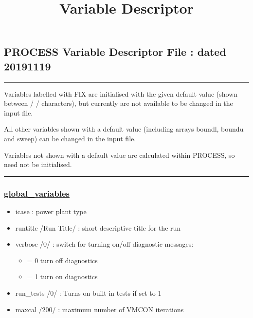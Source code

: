 \documentclass[]{article}
\title{Variable Descriptor}
\date{}
\providecommand{\tightlist}{%
  \setlength{\itemsep}{0pt}\setlength{\parskip}{0pt}}
\begin{document}
\maketitle

\subsection{PROCESS Variable Descriptor File : dated
20191119}\label{process-variable-descriptor-file-dated-20191119}

\begin{center}\rule{0.5\linewidth}{\linethickness}\end{center}

Variables labelled with FIX are initialised with the given default value
(shown between / / characters), but currently are not available to be
changed in the input file.

All other variables shown with a default value (including arrays boundl,
boundu and sweep) can be changed in the input file.

Variables not shown with a default value are calculated within PROCESS,
so need not be initialised.

\begin{center}\rule{0.5\linewidth}{\linethickness}\end{center}

\subsubsection{\texorpdfstring{\href{global_variables.html}{global\_variables}}{global\_variables}}\label{global_variables}

\begin{itemize}
\tightlist
\item
  icase : power plant type
\item
  runtitle /Run Title/ : short descriptive title for the run
\item
  verbose /0/ : switch for turning on/off diagnostic messages:

  \begin{itemize}
  \tightlist
  \item
    = 0 turn off diagnostics
  \item
    = 1 turn on diagnostics
  \end{itemize}
\item
  run\_tests /0/ : Turns on built-in tests if set to 1
\item
  maxcal /200/ : maximum number of VMCON iterations
\end{itemize}
\end{document}
